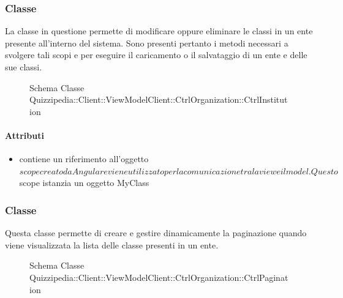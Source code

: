 \subsubsection{Classe }
La classe in questione permette di modificare oppure eliminare le classi in un ente presente all'interno del sistema.
Sono presenti pertanto i metodi necessari a svolgere tali scopi e per eseguire il caricamento o il salvataggio di un ente e delle sue classi.
\begin{figure}[H]
\centering
\noindent{}
\caption[Schema Classe CtrlInstitution]{Schema Classe Quizzipedia::Client::ViewModelClient::CtrlOrganization::CtrlInstitution}
\end{figure}
\paragraph{Attributi}
\begin{itemize}
\item {}
\newline
contiene un riferimento all'oggetto $scope creato da Angular e viene utilizzato per la comunicazione tra la view e il model. Questo $scope istanzia un oggetto MyClass
\end{itemize}
\subsubsection{Classe }
Questa classe permette di creare e gestire dinamicamente la paginazione quando viene visualizzata la lista delle classe presenti in un ente.
\begin{figure}[H]
\centering
\noindent{}
\caption[Schema Classe CtrlPagination]{Schema Classe Quizzipedia::Client::ViewModelClient::CtrlOrganization::CtrlPagination}
\end{figure}
